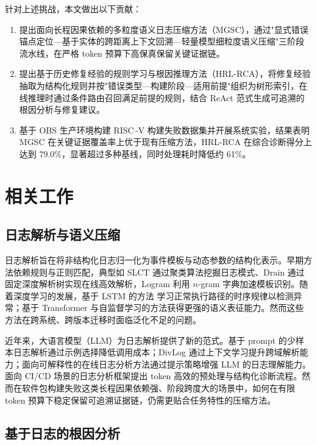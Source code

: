 \documentclass[10pt,conference]{IEEEtran}
\begin{document}
针对上述挑战，本文做出以下贡献：
\begin{enumerate}
\item 提出面向长程因果依赖的多粒度语义日志压缩方法（MGSC），通过"显式错误锚点定位—基于实体的跨距离上下文回溯—轻量模型细粒度语义压缩"三阶段流水线，在严格 token 预算下高保真保留关键证据链。
\item 提出基于历史修复经验的规则学习与根因推理方法（HRL-RCA），将修复经验抽取为结构化规则并按"错误类型—构建阶段—适用前提"组织为树形索引，在线推理时通过条件路由召回满足前提的规则，结合 ReAct 范式生成可追溯的根因分析与修复建议。
\item 基于 OBS 生产环境构建 RISC\,-V 构建失败数据集并开展系统实验，结果表明 MGSC 在关键证据覆盖率上优于现有压缩方法，HRL-RCA 在综合诊断得分上达到 79.0\%，显著超过多种基线，同时处理耗时降低约 61\%。
\end{enumerate}


\section{相关工作}

\subsection{日志解析与语义压缩}

日志解析旨在将非结构化日志归一化为事件模板与动态参数的结构化表示。早期方法依赖规则与正则匹配，典型如 SLCT\cite{r18} 通过聚类算法挖掘日志模式、Drain\cite{r20} 通过固定深度解析树实现在线高效解析，Logram\cite{r17} 利用 $n$-gram 字典加速模板识别。随着深度学习的发展，基于 LSTM 的方法\cite{r5} 学习正常执行路径的时序规律以检测异常；基于 Transformer 与自监督学习的方法获得更强的语义表征能力\cite{r6}。然而这些方法在跨系统、跨版本迁移时面临泛化不足的问题。

近年来，大语言模型（LLM）为日志解析提供了新的范式\cite{r8}。基于 prompt 的少样本日志解析\cite{r21}通过示例选择降低调用成本；DivLog\cite{r22} 通过上下文学习提升跨域解析能力；面向可解释性的在线日志分析方法\cite{r10}通过提示策略增强 LLM 的日志理解能力。面向 CI/CD 场景的日志分析框架\cite{r9}提出 token 高效的预处理与结构化诊断流程。然而在软件包构建失败这类长程因果依赖强、阶段跨度大的场景中，如何在有限 token 预算下稳定保留可追溯证据链，仍需更贴合任务特性的压缩方法。

\subsection{基于日志的根因分析}
\end{document}
